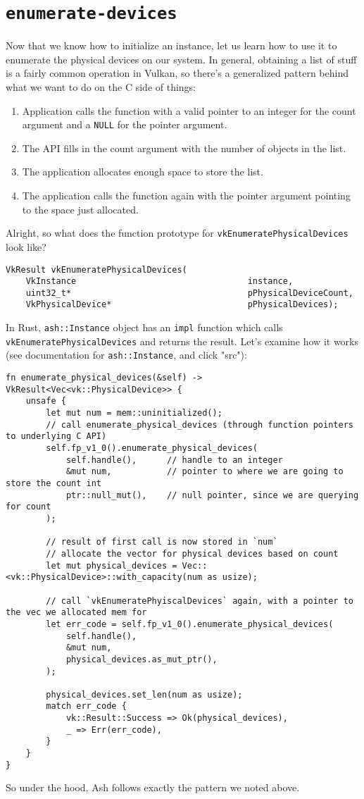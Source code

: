\documentclass[12pt,letterpaper]{article}
\newcommand{\ril}[1]{\texttt{#1}}
\newcommand{\cil}[1]{\texttt{#1}}
\begin{document}
\section{\texttt{enumerate-devices}}
	Now that we know how to initialize an instance, let us learn how to use it to enumerate the physical devices on our system. In general, obtaining a list of stuff is a fairly common operation in Vulkan, so there's a generalized pattern behind what we want to do on the C side of things:
		\begin{enumerate}
			\item Application calls the function with a valid pointer to an integer for the count argument and a \cil{NULL} for the pointer argument.
			
			\item The API fills in the count argument with the number of objects in the list.
			
			\item The application allocates enough space to store the list.
			
			\item The application calls the function again with the pointer argument pointing to the space just allocated.
		\end{enumerate}
	
	Alright, so what does the function prototype for \cil{vkEnumeratePhysicalDevices} look like?
	\begin{verbatim}
VkResult vkEnumeratePhysicalDevices(
	VkInstance                                  instance,
	uint32_t*                                   pPhysicalDeviceCount,
	VkPhysicalDevice*                           pPhysicalDevices);
	\end{verbatim}
	
	In Rust, \ril{ash::Instance} object has an \ril{impl} function which calls \cil{vkEnumeratePhysicalDevices} and returns the result. Let's examine how it works (see documentation for \ril{ash::Instance}, and click "src"):
		\begin{verbatim}
fn enumerate_physical_devices(&self) -> VkResult<Vec<vk::PhysicalDevice>> {
	unsafe {
		let mut num = mem::uninitialized();
		// call enumerate_physical_devices (through function pointers to underlying C API)
		self.fp_v1_0().enumerate_physical_devices(
			self.handle(), 		// handle to an integer
			&mut num,			// pointer to where we are going to store the count int
			ptr::null_mut(),	// null pointer, since we are querying for count 
		);
		
		// result of first call is now stored in `num`
		// allocate the vector for physical devices based on count
		let mut physical_devices = Vec::<vk::PhysicalDevice>::with_capacity(num as usize);
		
		// call `vkEnumeratePhyiscalDevices` again, with a pointer to the vec we allocated mem for
		let err_code = self.fp_v1_0().enumerate_physical_devices(
			self.handle(),
			&mut num,
			physical_devices.as_mut_ptr(),
		);
		
		physical_devices.set_len(num as usize);
		match err_code {
			vk::Result::Success => Ok(physical_devices),
			_ => Err(err_code),
		}
	}
}
		\end{verbatim}
		
	So under the hood, Ash follows exactly the pattern we noted above. 
\end{document}
